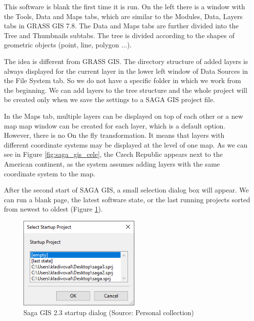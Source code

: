 \documentclass[a4paper,10pt,twoside]{article}
\begin{document}
This software is blank the first time it is run. On the left there is a window with the Tools, Data and Maps tabs, which are similar to the Modules, Data, Layers tabs in GRASS GIS 7.8. The Data and Maps tabs are further divided into the Tree and Thumbnails subtabs. The tree is divided according to the shapes of geometric objects (point, line, polygon ...). 

The idea is different from GRASS GIS. The directory structure of added layers is always displayed for the current layer in the lower left window of Data Sources in the File System tab. So we do not have a specific folder in which we work from the beginning. We can add layers to the tree structure and the whole project will be created only when we save the settings to a SAGA GIS project file.

In the Maps tab, multiple layers can be displayed on top of each other or a new map map window can be created for each layer, which is a default option. However, there is no On the fly transformation. It means that layers with different coordinate systems may be displayed at the level of one map.  As we can see in Figure \ref{fig:saga_gis_cele}, the Czech Republic appears next to the American continent, as the system assumes adding layers with the same coordinate system to the map.

After the second start of SAGA GIS, a small selection dialog box will appear. We can run a blank page, the latest software state, or the last running projects sorted from newest to oldest (Figure \ref{fig:saga_startup}).

\vspace{0.3cm}
\begin{figure}[hbt!] 
\begin{center}
\includegraphics[width=6cm]{../pictures/saga_startup.png} 
\caption[Saga GIS 2.3 startup dialog]{Saga GIS 2.3 startup dialog (Source: Personal collection)}
\label{fig:saga_startup}
\end{center}
\end{figure}

\vspace*{-1cm} 
\end{document}
